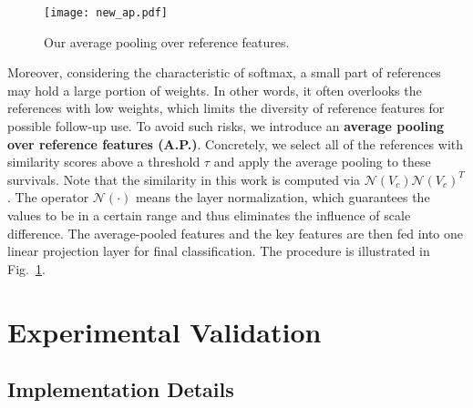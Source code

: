 \documentclass[letterpaper]{article} \usepackage{aaai23}  \usepackage{times}  \usepackage{helvet}  \usepackage{courier}  \usepackage[hyphens]{url}  \usepackage{graphicx} \urlstyle{rm} \def\UrlFont{\rm}  \usepackage{natbib}  \usepackage{caption} \usepackage{xcolor}
\begin{document}
 
\begin{figure}[t]
\centering
\texttt{[image: new\_ap.pdf]}
\caption{Our average pooling over reference features.}
\label{fig:ave pooling fig}
\end{figure}

Moreover, considering the characteristic of softmax, a small part of references may hold a large portion of weights. In other words, it often overlooks the references with low weights, which limits the diversity of reference features for possible follow-up use. To avoid such risks, we introduce an \textbf{average pooling over reference features (A.P.)}. Concretely, we select all of the references with similarity scores above a threshold $\tau$ and apply the average pooling to these survivals. Note that the similarity in this work is computed via $\mathcal{N}(V_c) \mathcal{N}(V_c)^{T}$. The operator $\mathcal{N}(\cdot)$ means the layer normalization, which guarantees the values to be in a certain range and thus eliminates the influence of scale difference.
The average-pooled features and the key features are then fed into one linear projection layer for final classification. The procedure is illustrated in Fig.~\ref{fig:ave pooling fig}. 

\section{Experimental Validation}

\subsection{Implementation Details}
\end{document}
